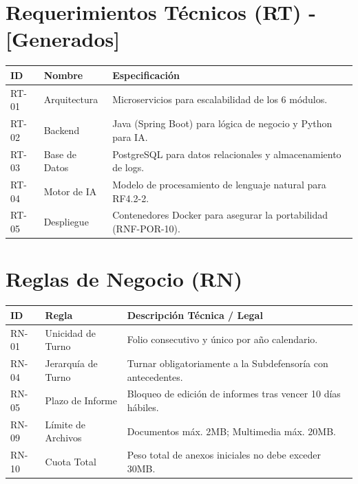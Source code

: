 \documentclass{article}
\begin{document}
\section*{Requerimientos Técnicos (RT) - [Generados]}

\begin{longtable}{|l|p{4cm}|p{8cm}|}
\hline
\textbf{ID} & \textbf{Nombre} & \textbf{Especificación} \\ \hline
RT-01 & Arquitectura & Microservicios para escalabilidad de los 6 módulos. \\ \hline
RT-02 & Backend & Java (Spring Boot) para lógica de negocio y Python para IA. \\ \hline
RT-03 & Base de Datos & PostgreSQL para datos relacionales y almacenamiento de logs. \\ \hline
RT-04 & Motor de IA & Modelo de procesamiento de lenguaje natural para RF4.2-2. \\ \hline
RT-05 & Despliegue & Contenedores Docker para asegurar la portabilidad (RNF-POR-10). \\ \hline
\end{longtable}

\section*{Reglas de Negocio (RN)}

\begin{longtable}{|l|p{4cm}|p{8cm}|}
\hline
\textbf{ID} & \textbf{Regla} & \textbf{Descripción Técnica / Legal} \\ \hline
RN-01 & Unicidad de Turno & Folio consecutivo y único por año calendario.  \\ \hline
RN-04 & Jerarquía de Turno & Turnar obligatoriamente a la Subdefensoría con antecedentes.  \\ \hline
RN-05 & Plazo de Informe & Bloqueo de edición de informes tras vencer 10 días hábiles.  \\ \hline
RN-09 & Límite de Archivos & Documentos máx. 2MB; Multimedia máx. 20MB.  \\ \hline
RN-10 & Cuota Total & Peso total de anexos iniciales no debe exceder 30MB.  \\ \hline
\end{longtable}
\end{document}
